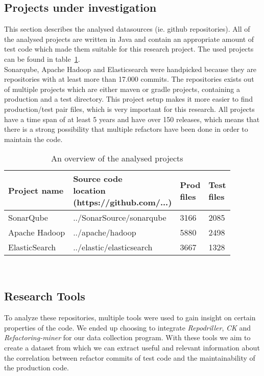 \subsection{Projects under investigation}
 This section describes the analysed datasources (ie. github repositories). All of the analysed projects are written in Java and contain an appropriate amount of test code which made them suitable for this research project. The used projects can be found in table~\ref{table:1}.\\
 Sonarqube, Apache Hadoop and Elasticsearch were handpicked because they are repositories with at least more than 17.000 commits. The repositories exists out of multiple projects which are either maven or gradle projects, containing a production and a test directory. This project setup makes it more easier to find production/test pair files, which is very important for this research. All projects have a time span of at least 5 years and have over 150 releases, which means that there is a strong possibility that multiple refactors have been done in order to maintain the code.
 \\
\begin{table}[!ht]
    \centering
    \begin{tabular}{l | l | l |l} 
     \hline 
     \textbf{Project name} & \thead{\textbf{Source code}\\\textbf{location}\\\tiny(https://github.com/...)\normalsize} & \thead{Prod\\files} & \thead{Test\\files} \\
     \hline
     SonarQube & ../SonarSource/sonarqube  & 3166 & 2085\\
     Apache Hadoop & ../apache/hadoop & 5880 & 2498 \\ 
     ElasticSearch & ../elastic/elasticsearch & 3667 & 1328 \\
     \hline
    \end{tabular}
    \caption{An overview of the analysed projects}
    \label{table:1}
\end{table}\\

\subsection{Research Tools}\label{Researchtools}
To analyze these repositories, multiple tools were used to gain insight on certain properties of the code. We ended up choosing to integrate \textit{Repodriller}, \textit{CK} and \textit{Refactoring-miner} for our data collection program. With these tools we aim to create a dataset from which we can extract useful and relevant information about the correlation between refactor commits of test code and the maintainability of the production code.

